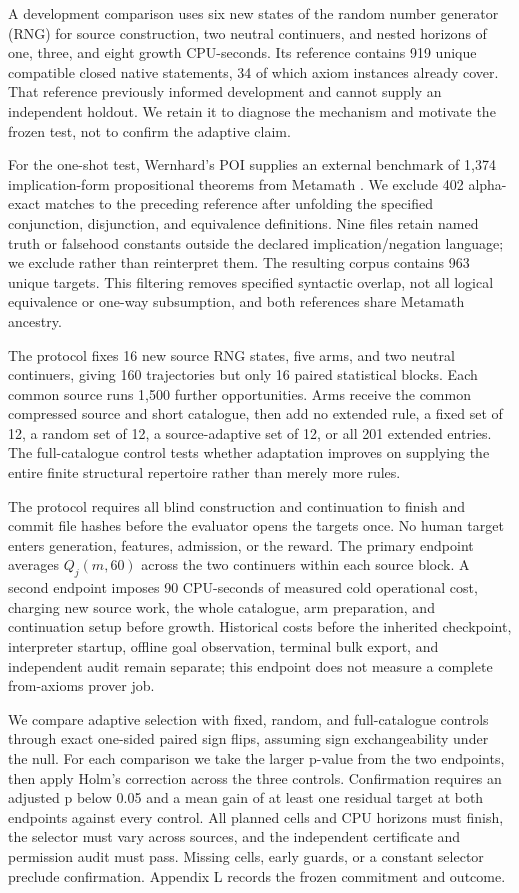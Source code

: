 \documentclass[pdflatex,sn-basic,Numbered]{sn-jnl}
\begin{document}
A development comparison uses six new states of the random number generator (RNG) for source construction, two neutral continuers, and nested horizons of one, three, and eight growth CPU-seconds. Its reference contains 919 unique compatible closed native statements, 34 of which axiom instances already cover. That reference previously informed development and cannot supply an independent holdout. We retain it to diagnose the mechanism and motivate the frozen test, not to confirm the adaptive claim.

For the one-shot test, Wernhard's POI supplies an external benchmark of 1,374 implication-form propositional theorems from Metamath \citep{Wernhard2026}. We exclude 402 alpha-exact matches to the preceding reference after unfolding the specified conjunction, disjunction, and equivalence definitions. Nine files retain named truth or falsehood constants outside the declared implication/negation language; we exclude rather than reinterpret them. The resulting corpus contains 963 unique targets. This filtering removes specified syntactic overlap, not all logical equivalence or one-way subsumption, and both references share Metamath ancestry.

The protocol fixes 16 new source RNG states, five arms, and two neutral continuers, giving 160 trajectories but only 16 paired statistical blocks. Each common source runs 1,500 further opportunities. Arms receive the common compressed source and short catalogue, then add no extended rule, a fixed set of 12, a random set of 12, a source-adaptive set of 12, or all 201 extended entries. The full-catalogue control tests whether adaptation improves on supplying the entire finite structural repertoire rather than merely more rules.

The protocol requires all blind construction and continuation to finish and commit file hashes before the evaluator opens the targets once. No human target enters generation, features, admission, or the reward. The primary endpoint averages \(Q_{j}(m,60)\) across the two continuers within each source block. A second endpoint imposes 90 CPU-seconds of measured cold operational cost, charging new source work, the whole catalogue, arm preparation, and continuation setup before growth. Historical costs before the inherited checkpoint, interpreter startup, offline goal observation, terminal bulk export, and independent audit remain separate; this endpoint does not measure a complete from-axioms prover job.

We compare adaptive selection with fixed, random, and full-catalogue controls through exact one-sided paired sign flips, assuming sign exchangeability under the null. For each comparison we take the larger p-value from the two endpoints, then apply Holm's correction across the three controls. Confirmation requires an adjusted p below 0.05 and a mean gain of at least one residual target at both endpoints against every control. All planned cells and CPU horizons must finish, the selector must vary across sources, and the independent certificate and permission audit must pass. Missing cells, early guards, or a constant selector preclude confirmation. Appendix L records the frozen commitment and outcome.
\end{document}
